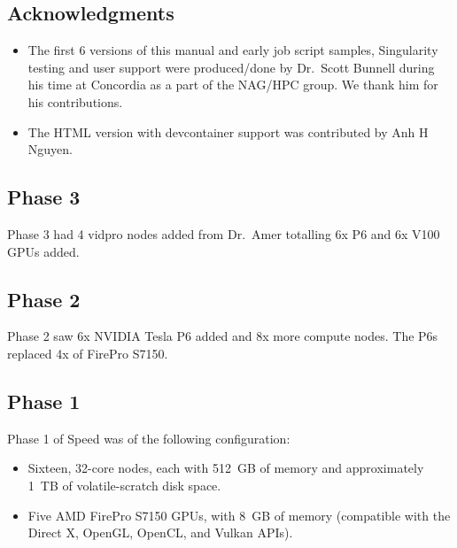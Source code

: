\documentclass{easychair}
\begin{document}
\subsection{Acknowledgments}
\label{sect:scott-acks}

\begin{itemize}
	\item 
The first 6 versions of this manual and early job script samples,
Singularity testing and user support were produced/done by Dr.~Scott Bunnell
during his time at Concordia as a part of the NAG/HPC group. We thank
him for his contributions.
	\item 
The HTML version with devcontainer support was contributed by Anh H Nguyen.
\end{itemize}

\subsection{Phase 3}

Phase 3 had 4 vidpro nodes added from Dr.~Amer totalling 6x P6 and 6x V100
GPUs added.

\subsection{Phase 2}

Phase 2 saw 6x NVIDIA Tesla P6 added and 8x more compute nodes.
The P6s replaced 4x of FirePro S7150.

\subsection{Phase 1}

Phase 1 of Speed was of the following configuration:

\begin{itemize}
\item
Sixteen, 32-core nodes, each with 512~GB of memory and approximately 1~TB of volatile-scratch disk space. 
\item
Five AMD FirePro S7150 GPUs, with 8~GB of memory (compatible with the Direct X, OpenGL, OpenCL, and Vulkan APIs). 
\end{itemize}

\end{document}
